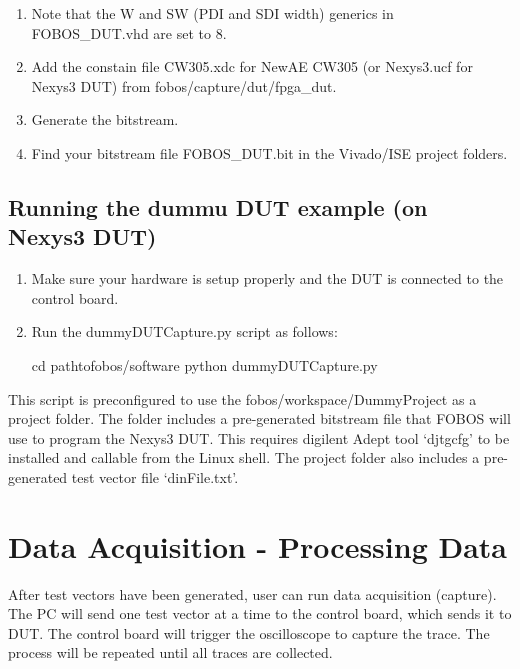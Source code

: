 \documentclass[letterpaper,10pt,english]{sphinxmanual}
\begin{document}
\begin{enumerate}
\def\theenumi{\arabic{enumi}}
\def\labelenumi{\theenumi .}
\makeatletter\def\p@enumii{\p@enumi \theenumi .}\makeatother
\setcounter{enumi}{2}
\item {} 
Note that the W and SW (PDI and SDI width) generics in FOBOS\_DUT.vhd are set to 8.

\item {} 
Add the constain file CW305.xdc for NewAE CW305 (or Nexys3.ucf for Nexys3 DUT) from fobos/capture/dut/fpga\_dut.

\item {} 
Generate the bitstream.

\item {} 
Find your bitstream file FOBOS\_DUT.bit in the Vivado/ISE project folders.

\end{enumerate}


\section{Running the dummu DUT example (on Nexys3 DUT)}
\label{\detokenize{dutdev:running-the-dummu-dut-example-on-nexys3-dut}}\begin{enumerate}
\def\theenumi{\arabic{enumi}}
\def\labelenumi{\theenumi .}
\makeatletter\def\p@enumii{\p@enumi \theenumi .}\makeatother
\item {} 
Make sure your hardware is setup properly and the DUT is connected to the control board.

\item {} 
Run the dummyDUTCapture.py script as follows:

\begin{sphinxVerbatim}[commandchars=\\\{\}]
\PYGZdl{} cd path\PYGZhy{}to\PYGZhy{}fobos/software
\PYGZdl{} python dummyDUTCapture.py
\end{sphinxVerbatim}

\end{enumerate}

This script is preconfigured to use the fobos/workspace/DummyProject as a project folder.
The folder includes a pre-generated bitstream file that FOBOS will use to program the Nexys3 DUT.
This requires digilent Adept tool ‘djtgcfg’ to be installed and callable from the Linux shell.
The project folder also includes a pre-generated test vector file ‘dinFile.txt’.


\chapter{Data Acquisition - Processing Data}
\label{\detokenize{capture_data:data-acquisition-processing-data}}\label{\detokenize{capture_data::doc}}
After test vectors have been generated, user can run data acquisition (capture). The PC will send one test vector at a time to the control board, which sends it to DUT. The control board will trigger the oscilloscope to capture the trace. The process will be repeated until all traces are collected.
\end{document}
